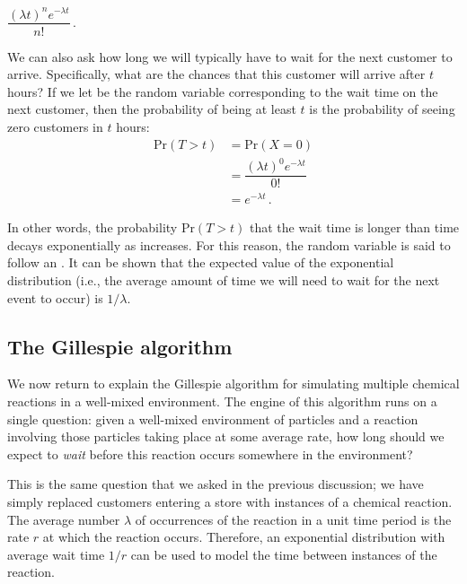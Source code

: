 \begin{center}
$\dfrac{(\lambda t)^n e^{-\lambda t}}{n!}$\,.
\end{center}

We can also ask how long we will typically have to wait for the next customer to arrive. Specifically, what are the chances that this customer will arrive after $t$ hours? If we let  be the random variable corresponding to the wait time on the next customer, then the probability of  being at least $t$ is the probability of seeing zero customers in $t$ hours:
\begin{align*}
\mathrm{Pr}(T > t) &= \mathrm{Pr}(X = 0)\\
& = \dfrac{(\lambda t)^0 e^{-\lambda t}}{0!}\\
& = e^{-\lambda t}\,.
\end{align*}

In other words, the probability $\mathrm{Pr}(T > t)$ that the wait time is longer than time  decays exponentially as  increases. For this reason, the random variable  is said to follow an . It can be shown that the expected value of the exponential distribution (i.e., the average amount of time we will need to wait for the next event to occur) is $1/\lambda$.\\

\begin{qbox}\end{qbox}

\FloatBarrier
{}
\subsection{The Gillespie algorithm}

We now return to explain the Gillespie algorithm for simulating multiple chemical reactions in a well-mixed environment. The engine of this algorithm runs on a single question: given a well-mixed environment of particles and a reaction involving those particles taking place at some average rate, how long should we expect to \textit{wait} before this reaction occurs somewhere in the environment?

This is the same question that we asked in the previous discussion; we have simply replaced customers entering a store with instances of a chemical reaction. The average number $\lambda$ of occurrences of the reaction in a unit time period is the rate $r$ at which the reaction occurs. Therefore, an exponential distribution with average wait time $1/r$ can be used to model the time between instances of the reaction.

